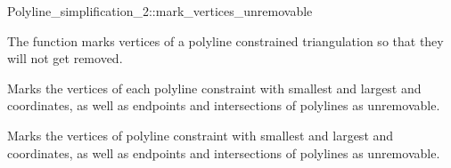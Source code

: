 \ccRefPageBegin

\begin{ccRefFunction}{Polyline_simplification_2::mark_vertices_unremovable}

\ccDefinition

The function \ccRefName{} marks vertices of a polyline constrained triangulation
so that they will not get removed.


{
Marks the vertices of each polyline constraint with smallest and largest  and  
coordinates, as well as endpoints and intersections of polylines as unremovable.
}

{
Marks the vertices of polyline constraint  with smallest and largest  and  
coordinates, as well as endpoints and intersections of polylines as unremovable.
}
\ccSeeAlso

\end{ccRefFunction}

\ccRefPageEnd
